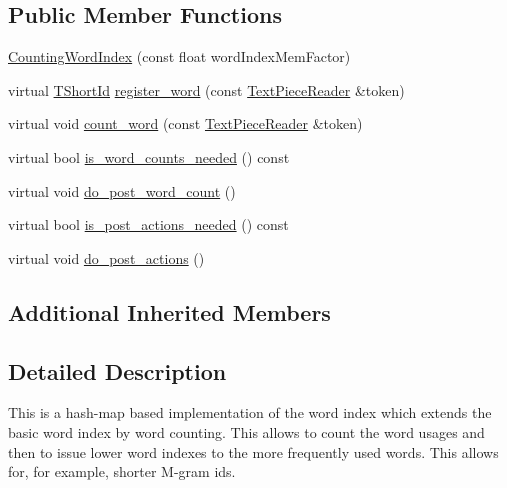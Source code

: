 \subsection*{Public Member Functions}
\begin{DoxyCompactItemize}
\item 
\hyperlink{classuva_1_1smt_1_1tries_1_1dictionary_1_1_counting_word_index_a9ea376675b8173dea3f020be64debb32}{Counting\+Word\+Index} (const float word\+Index\+Mem\+Factor)
\item 
virtual \hyperlink{namespaceuva_1_1smt_1_1hashing_adcf22e1982ad09d3a63494c006267469}{T\+Short\+Id} \hyperlink{classuva_1_1smt_1_1tries_1_1dictionary_1_1_counting_word_index_a71c5719f7b5432866315ea0db9e1f770}{register\+\_\+word} (const \hyperlink{classuva_1_1smt_1_1file_1_1_text_piece_reader}{Text\+Piece\+Reader} \&token)
\item 
virtual void \hyperlink{classuva_1_1smt_1_1tries_1_1dictionary_1_1_counting_word_index_a2ea1e4f9b83be0d112374f3aed62afd8}{count\+\_\+word} (const \hyperlink{classuva_1_1smt_1_1file_1_1_text_piece_reader}{Text\+Piece\+Reader} \&token)
\item 
virtual bool \hyperlink{classuva_1_1smt_1_1tries_1_1dictionary_1_1_counting_word_index_a9d164d285f9b7498d9db3086426e7876}{is\+\_\+word\+\_\+counts\+\_\+needed} () const 
\item 
virtual void \hyperlink{classuva_1_1smt_1_1tries_1_1dictionary_1_1_counting_word_index_a4723e7a931ff4732ce3c001848656c2a}{do\+\_\+post\+\_\+word\+\_\+count} ()
\item 
virtual bool \hyperlink{classuva_1_1smt_1_1tries_1_1dictionary_1_1_counting_word_index_a760ba6fe9be1c7e3959f3f7ff3daefd5}{is\+\_\+post\+\_\+actions\+\_\+needed} () const 
\item 
virtual void \hyperlink{classuva_1_1smt_1_1tries_1_1dictionary_1_1_counting_word_index_a4c4ec12cb6c772d41fd5f39ce299a940}{do\+\_\+post\+\_\+actions} ()
\end{DoxyCompactItemize}
\subsection*{Additional Inherited Members}


\subsection{Detailed Description}
This is a hash-\/map based implementation of the word index which extends the basic word index by word counting. This allows to count the word usages and then to issue lower word indexes to the more frequently used words. This allows for, for example, shorter M-\/gram ids. 

